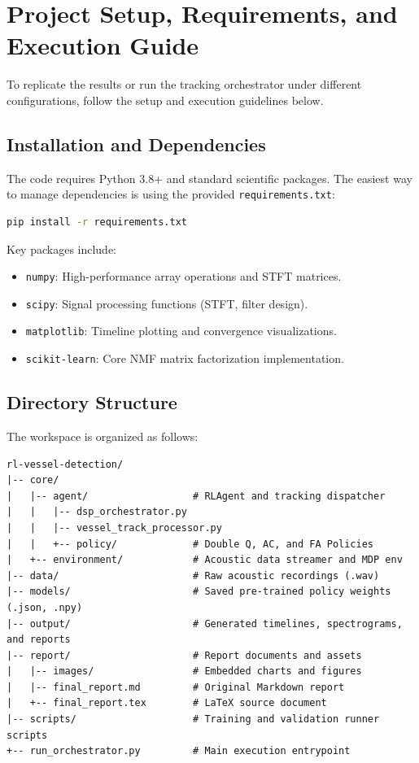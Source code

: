 \documentclass[12pt,a4paper]{article}
\begin{document}
\section{Project Setup, Requirements, and Execution Guide}
To replicate the results or run the tracking orchestrator under different configurations, follow the setup and execution guidelines below.

\subsection{Installation and Dependencies}
The code requires Python 3.8+ and standard scientific packages. The easiest way to manage dependencies is using the provided \texttt{requirements.txt}:
\begin{lstlisting}[language=bash]
pip install -r requirements.txt
\end{lstlisting}
Key packages include:
\begin{itemize}
    \item \texttt{numpy}: High-performance array operations and STFT matrices.
    \item \texttt{scipy}: Signal processing functions (STFT, filter design).
    \item \texttt{matplotlib}: Timeline plotting and convergence visualizations.
    \item \texttt{scikit-learn}: Core NMF matrix factorization implementation.
\end{itemize}

\subsection{Directory Structure}
The workspace is organized as follows:
\begin{lstlisting}
rl-vessel-detection/
|-- core/
|   |-- agent/                  # RLAgent and tracking dispatcher
|   |   |-- dsp_orchestrator.py
|   |   |-- vessel_track_processor.py
|   |   +-- policy/             # Double Q, AC, and FA Policies
|   +-- environment/            # Acoustic data streamer and MDP env
|-- data/                       # Raw acoustic recordings (.wav)
|-- models/                     # Saved pre-trained policy weights (.json, .npy)
|-- output/                     # Generated timelines, spectrograms, and reports
|-- report/                     # Report documents and assets
|   |-- images/                 # Embedded charts and figures
|   |-- final_report.md         # Original Markdown report
|   +-- final_report.tex        # LaTeX source document
|-- scripts/                    # Training and validation runner scripts
+-- run_orchestrator.py         # Main execution entrypoint
\end{lstlisting}
\end{document}
